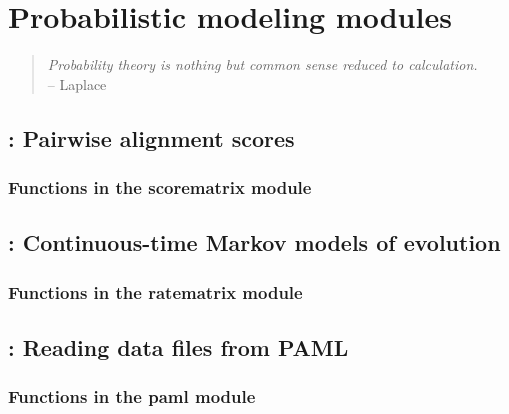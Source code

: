 \documentclass[10pt]{book}
\begin{document}



\chapter{Probabilistic modeling modules}
\begin{quote}
  \emph{Probability theory is nothing but common sense reduced to
  calculation.}\\
\hspace*{1em}\hfill -- Laplace
\end{quote}

\newpage
\section{: Pairwise alignment scores}

\subsection{Functions in the scorematrix module}


\newpage
\section{: Continuous-time Markov models of evolution}

\subsection{Functions in the ratematrix module}


\newpage
\section{: Reading data files from PAML}

\subsection{Functions in the paml module}

\end{document}
